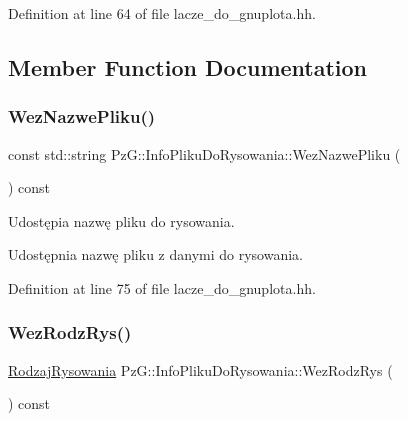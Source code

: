 Definition at line 64 of file lacze\+\_\+do\+\_\+gnuplota.\+hh.



\subsection{Member Function Documentation}
\mbox{\label{class_pz_g_1_1_info_pliku_do_rysowania_ac92a5dc258f9b6164631e2ea5247a7a7}} 
\subsubsection{\texorpdfstring{Wez\+Nazwe\+Pliku()}{WezNazwePliku()}}
{\footnotesize\ttfamily const std\+::string Pz\+G\+::\+Info\+Pliku\+Do\+Rysowania\+::\+Wez\+Nazwe\+Pliku (\begin{DoxyParamCaption}{ }\end{DoxyParamCaption}) const\hspace{0.3cm}{\ttfamily [inline]}}



Udostępia nazwę pliku do rysowania. 

Udostępnia nazwę pliku z danymi do rysowania. 

Definition at line 75 of file lacze\+\_\+do\+\_\+gnuplota.\+hh.

\mbox{\label{class_pz_g_1_1_info_pliku_do_rysowania_a6a46f3c7b7a08dfa9d694f387f873234}} 
\subsubsection{\texorpdfstring{Wez\+Rodz\+Rys()}{WezRodzRys()}}
{\footnotesize\ttfamily \hyperlink{namespace_pz_g_a705c92106f39b7d0c34a6739d10ff0b6}{Rodzaj\+Rysowania} Pz\+G\+::\+Info\+Pliku\+Do\+Rysowania\+::\+Wez\+Rodz\+Rys (\begin{DoxyParamCaption}{ }\end{DoxyParamCaption}) const\hspace{0.3cm}{\ttfamily [inline]}}



